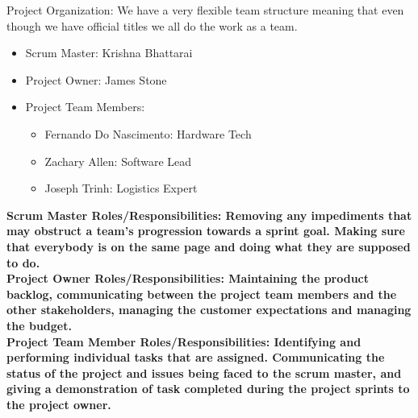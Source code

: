 
Project Organization: We have a very flexible team structure meaning that even though we have official titles we all do the work as a team. 
\begin{itemize}
	\item {Scrum Master:}  {Krishna Bhattarai}
	\item {Project Owner:} {James Stone}
	\item {Project Team Members:}
			\begin{itemize} 
			\item {Fernando Do Nascimento: Hardware Tech}
			\item {Zachary Allen: Software Lead}
			\item {Joseph Trinh: Logistics Expert}
			\end{itemize}
\end{itemize}
\bf {Scrum Master Roles/Responsibilities:} Removing any impediments that may obstruct a team’s progression towards a sprint goal. Making sure that everybody is on the same page and doing what they are supposed to do.\\
\bf {Project Owner Roles/Responsibilities:} Maintaining the product backlog, communicating between the project team members and the other stakeholders, managing the customer expectations and managing the budget.\\
\bf {Project Team Member Roles/Responsibilities:} Identifying and performing individual tasks that are assigned. Communicating the status of the project and issues being faced to the scrum master, and giving a demonstration of task completed during the project sprints to the project owner.